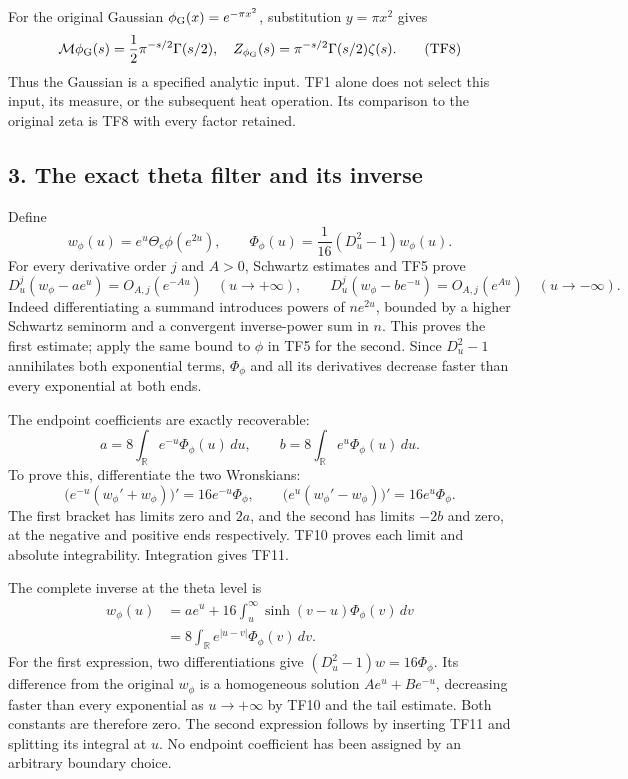 \documentclass[
  10pt,
  a4paper,
]{article}
\begin{document}
For the original Gaussian \(\phi_{\rm G}(x)=e^{-\pi x^2}\), substitution
\(y=\pi x^2\) gives \[
\mathcal M\phi_{\rm G}(s)=\frac12\pi^{-s/2}\Gamma(s/2),\quad
Z_{\phi_{\rm G}}(s)=\pi^{-s/2}\Gamma(s/2)\zeta(s).
\tag{TF8}
\] Thus the Gaussian is a specified analytic input. TF1 alone does not
select this input, its measure, or the subsequent heat operation. Its
comparison to the original zeta is TF8 with every factor retained.

\subsection{3. The exact theta filter and its
inverse}\label{the-exact-theta-filter-and-its-inverse}

Define \[
w_\phi(u)=e^u\Theta_e\phi(e^{2u}),\qquad
\Phi_\phi(u)=\frac1{16}(D_u^2-1)w_\phi(u).
\tag{TF9}
\] For every derivative order \(j\) and \(A>0\), Schwartz estimates and
TF5 prove \[
D_u^j(w_\phi-ae^u)=O_{A,j}(e^{-Au})\quad(u\to+\infty),
\qquad
D_u^j(w_\phi-be^{-u})=O_{A,j}(e^{Au})\quad(u\to-\infty).
\tag{TF10}
\] Indeed differentiating a summand introduces powers of \(ne^{2u}\),
bounded by a higher Schwartz seminorm and a convergent inverse-power sum
in \(n\). This proves the first estimate; apply the same bound to
\(\widehat\phi\) in TF5 for the second. Since \(D_u^2-1\) annihilates
both exponential terms, \(\Phi_\phi\) and all its derivatives decrease
faster than every exponential at both ends.

The endpoint coefficients are exactly recoverable: \[
a=8\int_{\mathbb R}e^{-u}\Phi_\phi(u)\,du,
\qquad b=8\int_{\mathbb R}e^u\Phi_\phi(u)\,du.
\tag{TF11}
\] To prove this, differentiate the two Wronskians: \[
\big(e^{-u}(w_\phi'+w_\phi)\big)'=16e^{-u}\Phi_\phi,
\qquad
\big(e^u(w_\phi'-w_\phi)\big)'=16e^u\Phi_\phi.
\tag{TF12}
\] The first bracket has limits zero and \(2a\), and the second has
limits \(-2b\) and zero, at the negative and positive ends respectively.
TF10 proves each limit and absolute integrability. Integration gives
TF11.

The complete inverse at the theta level is \[
\begin{aligned}
w_\phi(u)
&=a e^u+16\int_u^\infty\sinh(v-u)\Phi_\phi(v)\,dv\\
&=8\int_{\mathbb R}e^{|u-v|}\Phi_\phi(v)\,dv.
\end{aligned}
\tag{TF13}
\] For the first expression, two differentiations give
\((D_u^2-1)w=16\Phi_\phi\). Its difference from the original \(w_\phi\)
is a homogeneous solution \(Ae^u+Be^{-u}\), decreasing faster than every
exponential as \(u\to+\infty\) by TF10 and the tail estimate. Both
constants are therefore zero. The second expression follows by inserting
TF11 and splitting its integral at \(u\). No endpoint coefficient has
been assigned by an arbitrary boundary choice.
\end{document}
